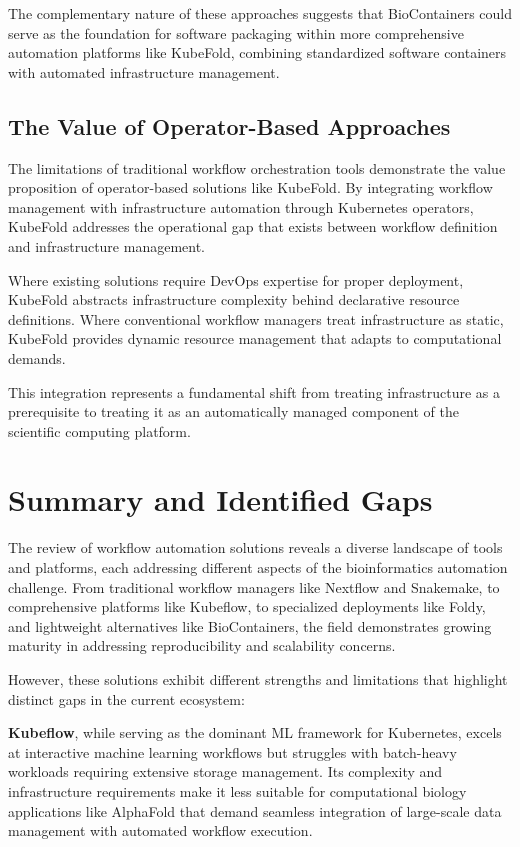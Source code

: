 The complementary nature of these approaches suggests that BioContainers could serve as the foundation for software packaging within more comprehensive automation platforms like KubeFold, combining standardized software containers with automated infrastructure management.

\subsection{The Value of Operator-Based Approaches}

The limitations of traditional workflow orchestration tools demonstrate the value proposition of operator-based solutions like KubeFold.
By integrating workflow management with infrastructure automation through Kubernetes operators, KubeFold addresses the operational gap that exists between workflow definition and infrastructure management.

Where existing solutions require DevOps expertise for proper deployment, KubeFold abstracts infrastructure complexity behind declarative resource definitions.
Where conventional workflow managers treat infrastructure as static, KubeFold provides dynamic resource management that adapts to computational demands.

This integration represents a fundamental shift from treating infrastructure as a prerequisite to treating it as an automatically managed component of the scientific computing platform.

\section{Summary and Identified Gaps}

The review of workflow automation solutions reveals a diverse landscape of tools and platforms, each addressing different aspects of the bioinformatics automation challenge.
From traditional workflow managers like Nextflow and Snakemake, to comprehensive platforms like Kubeflow, to specialized deployments like Foldy, and lightweight alternatives like BioContainers, the field demonstrates growing maturity in addressing reproducibility and scalability concerns.

However, these solutions exhibit different strengths and limitations that highlight distinct gaps in the current ecosystem:

\textbf{Kubeflow}, while serving as the dominant ML framework for Kubernetes, excels at interactive machine learning workflows but struggles with batch-heavy workloads requiring extensive storage management.
Its complexity and infrastructure requirements make it less suitable for computational biology applications like AlphaFold that demand seamless integration of large-scale data management with automated workflow execution.

